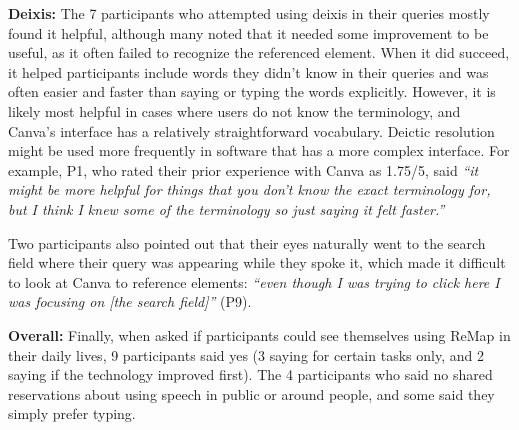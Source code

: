 \textbf{Deixis:}
The 7 participants who attempted using deixis in their queries mostly found it helpful, although many noted that it needed some improvement to be useful, as it often failed to recognize the referenced element. When it did succeed, it helped participants include words they didn't know in their queries and was often easier and faster than saying or typing the words explicitly. However, it is likely most helpful in cases where users do not know the terminology, and Canva's interface has a relatively straightforward vocabulary. Deictic resolution might be used more frequently in software that has a more complex interface. For example, P1, who rated their prior experience with Canva as 1.75/5, said \textit{``it might be more helpful for things that you don't know the exact terminology for, but I think I knew some of the terminology so just saying it felt faster.''}

Two participants also pointed out that their eyes naturally went to the search field where their query was appearing while they spoke it, which made it difficult to look at Canva to reference elements: \textit{``even though I was trying to click here I was focusing on [the search field]''} (P9).

\textbf{Overall:}
Finally, when asked if participants could see themselves using ReMap in their daily lives, 9 participants said yes (3 saying for certain tasks only, and 2 saying if the technology improved first). The 4 participants who said no shared reservations about using speech in public or around people, and some said they simply prefer typing.
